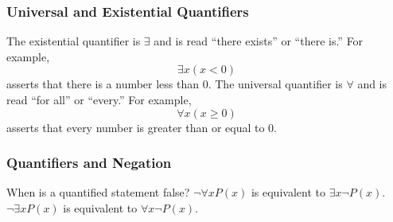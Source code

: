 \documentclass[11pt, compress]{beamer}
\begin{document}
\begin{frame}
\frametitle{Universal and Existential Quantifiers}
 
The existential quantifier is \(\exists\) and is read ``there exists'' or ``there is.'' For example,%
\begin{equation*}
\exists x (x \lt 0)
\end{equation*}
asserts that there is a number less than 0. 
\pause 
The universal quantifier is \(\forall\) and is read ``for all'' or ``every.'' For example,%
\begin{equation*}
\forall x (x \ge 0)
\end{equation*}
asserts that every number is greater than or equal to 0.\end{frame}
 
\begin{frame}
\frametitle{Quantifiers and Negation}
 
When is a quantified statement false? 
\(\neg \forall x P(x)\) is equivalent to \(\exists x \neg P(x)\). 
\(\neg \exists x P(x)\) is equivalent to \(\forall x \neg P(x)\).\end{frame}
 
\end{document}
